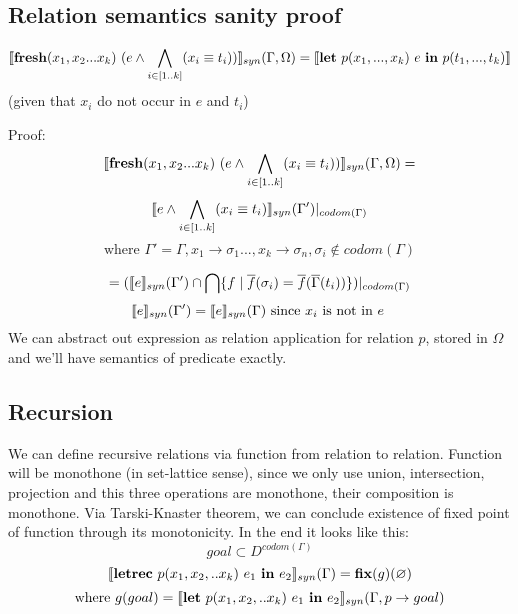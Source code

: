 \documentclass[fleqn]{article}
\begin{document}
\subsection{Relation semantics sanity proof}
\[ \semantics{ \keyword{fresh}(x_1, x_2 ... x_k)\ (e \wedge \bigwedge_{i \in [1 .. k]} (x_i \equiv t_i)) }_{syn}(\Gamma, \Omega) = \semantics{\keyword{let}\ p(x_1, ... ,x_k)\ e\ \keyword{in}\ p(t_1, ..., t_k)  } \]
(given that \( x_i \) do not occur in \( e \) and \( t_i \))

Proof:
\[ \llbracket \textrm{\textbf{fresh}}(x_1, x_2 ... x_k)\ (e \wedge \bigwedge_{i \in [1 .. k]} (x_i \equiv t_i)) \rrbracket_{syn}(\Gamma, \Omega) = \]
\[ \llbracket e \wedge \bigwedge_{i \in [1 .. k]} (x_i \equiv t_i) \rrbracket_{syn}(\Gamma')|_{codom(\Gamma)} \]
\[\textrm{where } \Gamma' = \Gamma, x_1 \rightarrow \sigma_1 ..., x_k \rightarrow \sigma_n, \sigma_i \notin codom(\Gamma) \]

\[ = (\llbracket e\rrbracket_{syn}(\Gamma') \cap \bigcap \{ f \mid \overline{f}(\sigma_i) = \overline{f}(\overline{\Gamma}(t_i)) \})|_{codom(\Gamma)} \]
\[ \llbracket e\rrbracket_{syn}(\Gamma') = \llbracket e\rrbracket_{syn}(\Gamma) \textrm{ since \(x_i\) is not in \(e\) } \]
We can abstract out expression as relation application for relation \(p\), stored in \( \Omega \) and we'll have semantics of predicate exactly.
\subsection{Recursion}
We can define recursive relations via function from relation to relation. Function will be monothone (in set-lattice sense), since we only use union, intersection, projection and this three operations are monothone, their composition is monothone. 
Via Tarski-Knaster theorem, we can conclude existence of fixed point of function through its monotonicity. 
In the end it looks like this:
\[ goal \subset D^{codom(\Gamma)} \]
\[\llbracket\textrm{\textbf{letrec}}\ p(x_1, x_2, .. x_k)\ e_1\ \textrm{\textbf{in}}\ e_2\rrbracket_{syn}(\Gamma) = \textrm{\textbf{fix}}(g)(\varnothing) \]
\[ \textrm{where } g(goal) = \semantics{\keyword{let}\ p(x_1, x_2, .. x_k)\ e_1\ \keyword{in}\ e_2}_{syn}(\Gamma, p \rightarrow goal) \]

\end{document}
